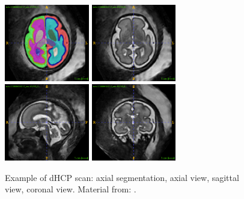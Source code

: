\begin{figure}[htbp]
    \centering
    \includegraphics[width=0.33\textwidth]{figures/dhcp_ax_dseg.png}
    \hspace{5pt}
    \includegraphics[width=0.33\textwidth]{figures/dhcp_ax.png} \\
    \vspace{10pt}
    \includegraphics[width=0.33\textwidth]{figures/dhcp_sag.png}
    \hspace{5pt}
    \includegraphics[width=0.33\textwidth]{figures/dhcp_cor.png}
    \caption{Example of dHCP scan: axial segmentation, axial view, sagittal view, coronal view. Material from: \cite{dHCP}.}
    \label{fig:dhcp_images}
\end{figure}

